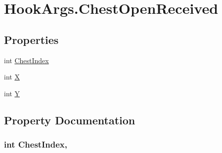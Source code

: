 \hypertarget{structOTA_1_1Plugin_1_1HookArgs_1_1ChestOpenReceived}{}\section{Hook\+Args.\+Chest\+Open\+Received}
\label{structOTA_1_1Plugin_1_1HookArgs_1_1ChestOpenReceived}
\subsection*{Properties}
\begin{DoxyCompactItemize}
\item 
int \hyperlink{structOTA_1_1Plugin_1_1HookArgs_1_1ChestOpenReceived_a7286e076e892ae131508703fde9b607f}{Chest\+Index}
\item 
int \hyperlink{structOTA_1_1Plugin_1_1HookArgs_1_1ChestOpenReceived_a80c0944640e62d3ed6c5419c1bcc0c88}{X}
\item 
int \hyperlink{structOTA_1_1Plugin_1_1HookArgs_1_1ChestOpenReceived_aa482c4cc86a24474e4fb19b5b5978778}{Y}
\end{DoxyCompactItemize}


\subsection{Property Documentation}
\hypertarget{structOTA_1_1Plugin_1_1HookArgs_1_1ChestOpenReceived_a7286e076e892ae131508703fde9b607f}{}
\subsubsection[{Chest\+Index}]{\setlength{\rightskip}{0pt plus 5cm}int Chest\+Index\hspace{0.3cm}{\ttfamily [get]}, {\ttfamily [set]}}\label{structOTA_1_1Plugin_1_1HookArgs_1_1ChestOpenReceived_a7286e076e892ae131508703fde9b607f}
\hypertarget{structOTA_1_1Plugin_1_1HookArgs_1_1ChestOpenReceived_a80c0944640e62d3ed6c5419c1bcc0c88}{}
